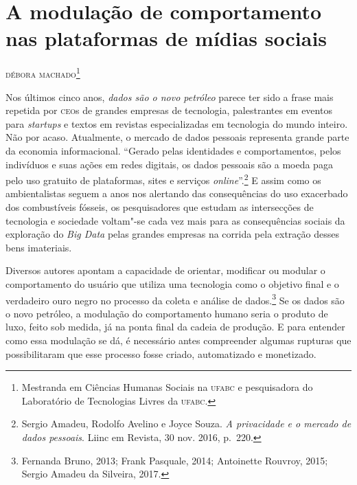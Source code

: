 \chapter[A modulação de comportamento nas plataformas de mídias sociais]{A modulação de comportamento\\ nas plataformas de mídias sociais}

\begin{flushright}
\textsc{débora machado\footnote{Mestranda em Ciências Humanas Sociais na \textsc{ufabc} e pesquisadora do Laboratório de Tecnologias Livres da \textsc{ufabc}.}}
\end{flushright}

\noindent{}Nos últimos cinco anos, \textit{dados são o novo petróleo} parece ter sido a
frase mais repetida por \textsc{ceo}s de grandes empresas de tecnologia,
palestrantes em eventos para \textit{startups} e textos em revistas
especializadas em tecnologia do mundo inteiro. Não por acaso.
Atualmente, o mercado de dados pessoais representa grande parte da
economia informacional. ``Gerado pelas identidades e comportamentos,
pelos indivíduos e suas ações em redes digitais, os dados pessoais são a
moeda paga pelo uso gratuito de plataformas, sites e serviços \textit{online}''.\footnote{Sergio Amadeu, Rodolfo Avelino e Joyce Souza. \textit{A privacidade e o
mercado de dados pessoais}. Liinc em Revista, 30 nov. 2016, p.\, 220.}
E assim como os ambientalistas
seguem a anos nos alertando das consequências do uso exacerbado dos
combustíveis fósseis, os pesquisadores que estudam as intersecções de
tecnologia e sociedade voltam"-se cada vez mais para as consequências
sociais da exploração do \textit{Big Data} pelas grandes empresas na corrida pela
extração desses bens imateriais.

Diversos autores apontam a capacidade de orientar, modificar ou modular
o comportamento do usuário que utiliza uma tecnologia como o objetivo
final e o verdadeiro ouro negro no processo da coleta e análise de dados.\footnote{Fernanda Bruno, 2013; Frank Pasquale, 2014; Antoinette Rouvroy, 2015; Sergio Amadeu da Silveira, 2017.} Se os dados são o novo petróleo, a modulação do comportamento humano seria o
produto de luxo, feito sob medida, já na ponta final da cadeia de
produção. E para entender como essa modulação se dá, é necessário antes
compreender algumas rupturas que possibilitaram que esse processo fosse
criado, automatizado e monetizado.

